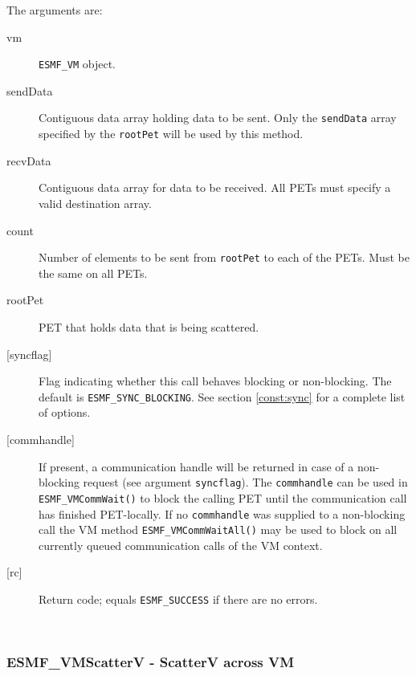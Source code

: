      The arguments are:
     \begin{description}
     \item[vm] 
          {\tt ESMF\_VM} object.
     \item[sendData]
          Contiguous data array holding data to be sent. Only the {\tt sendData}
          array specified by the {\tt rootPet} will be used by this method.
     \item[recvData] 
          Contiguous data array for data to be received. All PETs must specify a
          valid destination array.
     \item[count] 
          Number of elements to be sent from {\tt rootPet} to each of the PETs.
          Must be the same on all PETs.
     \item[rootPet] 
          PET that holds data that is being scattered.
     \item[{[syncflag]}]
          Flag indicating whether this call behaves blocking or non-blocking.
          The default is {\tt ESMF\_SYNC\_BLOCKING}. See section
          \ref{const:sync} for a complete list of options.
     \item[{[commhandle]}]
          If present, a communication handle will be returned in case of a 
          non-blocking request (see argument {\tt syncflag}). The
          {\tt commhandle} can be used in {\tt ESMF\_VMCommWait()} to block the
          calling PET until the communication call has finished PET-locally. If
          no {\tt commhandle} was supplied to a non-blocking call the VM method
          {\tt ESMF\_VMCommWaitAll()} may be used to block on all currently queued
          communication calls of the VM context.
     \item[{[rc]}] 
          Return code; equals {\tt ESMF\_SUCCESS} if there are no errors.
     \end{description}
   
 
\mbox{}\hrulefill\ 
 
\subsubsection [ESMF\_VMScatterV] {ESMF\_VMScatterV - ScatterV across VM}



